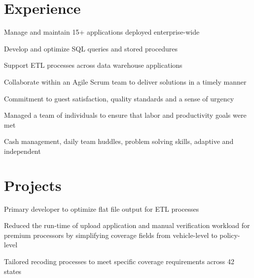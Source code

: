 \documentclass[]{latex/resume}
\begin{document}
\begin{minipage}[t]{0.75\textwidth}
\section{Experience}
     
    \vspace{\topsep} %
    \begin{tightemize}
        \sectionsep
            \item Manage and maintain 15+ applications deployed enterprise-wide
            \item Develop and optimize SQL queries and stored procedures
            \item Support ETL processes across data warehouse applications
            \item Collaborate within an Agile Scrum team to deliver solutions in a timely manner
        \end{tightemize}
    
    \sectionsep

     
    \vspace{\topsep} %
    \begin{tightemize}
            \item Commitment to guest satisfaction, quality standards and a sense of urgency
            \item Managed a team of individuals to ensure that labor and productivity goals were met
            \item Cash management, daily team huddles, problem solving skills, adaptive and independent
    \end{tightemize}
    



\section{Projects}

     
    \begin{tightemize}
        \item Primary developer to optimize flat file output for ETL processes
        \item Reduced the run-time of upload application and manual verification workload for premium processors by simplifying coverage fields from vehicle-level to policy-level
        \item Tailored recoding processes to meet specific coverage requirements across 42 states
    \end{tightemize}


\end{minipage}
\end{document}
